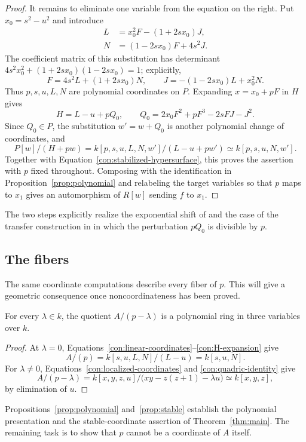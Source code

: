 \begin{proof}
It remains to eliminate one variable from the equation on the right.
Put $x_0=s^2-u^2$ and introduce
\begin{equation}\label{con:linear-coordinates}
 \begin{aligned}
 L&=x_0^2F-(1+2sx_0)J,\\
 N&=(1-2sx_0)F+4s^2J.
 \end{aligned}
\end{equation}
The coefficient matrix of this substitution has determinant
$4s^2x_0^2+(1+2sx_0)(1-2sx_0)=1$; explicitly,
\begin{equation}\label{con:linear-inverse}
 F=4s^2L+(1+2sx_0)N,\qquad
 J=-(1-2sx_0)L+x_0^2N.
\end{equation}
Thus $p,s,u,L,N$ are polynomial coordinates on $P$.  Expanding $x=x_0+pF$
in $H$ gives
\begin{equation}\label{con:H-expansion}
 H=L-u+pQ_0,\qquad Q_0=2x_0F^2+pF^3-2sFJ-J^2.
\end{equation}
Since $Q_0\in P$, the substitution $w'=w+Q_0$ is another polynomial change
of coordinates, and
\[
 P[w]/(H+pw)
 =k[p,s,u,L,N,w']/(L-u+pw')
 \simeq k[p,s,u,N,w'].
\]
Together with Equation~\eqref{con:stabilized-hypersurface}, this proves the
assertion with $p$ fixed throughout.
Composing with the identification in Proposition~\ref{prop:polynomial} and
relabeling the target variables so that $p$ maps to $x_1$ gives an
automorphism of $R[w]$ sending $f$ to $x_1$.
\end{proof}

The two steps explicitly realize the exponential shift of
\cite[Lemma~3.3]{DuttaLahiri2021} and the case of the transfer construction
in \cite[Theorem~7]{EdoVenereau2001} in which the perturbation $pQ_0$ is
divisible by $p$.

\subsection{The fibers}

The same coordinate computations describe every fiber of $p$.  This will
give a geometric consequence once noncoordinateness has been proved.

\begin{proposition}\label{prop:fibers}
For every $\lambda\in k$, the quotient $A/(p-\lambda)$ is a polynomial
ring in three variables over $k$.
\end{proposition}

\begin{proof}
At $\lambda=0$, Equations~\eqref{con:linear-coordinates}--\eqref{con:H-expansion}
give
\[
 A/(p)=k[s,u,L,N]/(L-u)=k[s,u,N].
\]
For $\lambda\ne0$, Equations~\eqref{con:localized-coordinates} and
\eqref{con:quadric-identity} give
\[
 A/(p-\lambda)
 =k[x,y,z,u]/\bigl(xy-z(z+1)-\lambda u\bigr)
 \simeq k[x,y,z],
\]
by elimination of $u$.
\end{proof}

Propositions~\ref{prop:polynomial} and~\ref{prop:stable} establish the
polynomial presentation and the stable-coordinate assertion of
Theorem~\ref{thm:main}.  The remaining task is to show that $p$ cannot be
a coordinate of $A$ itself.
